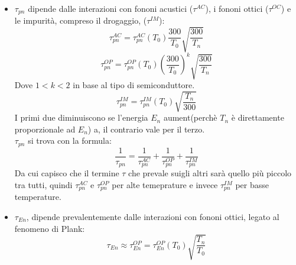 \begin{itemize}
    \item  $\tau_{pn}$ dipende dalle interazioni con fononi acustici ($\tau^{AC}$), i fononi ottici ($\tau^{OC}$) e le impurità, compreso il drogaggio, ($\tau^{IM}$):
\begin{equation}
    \tau_{pn}^{AC}=\tau_{pn}^{AC}(T_0)\dfrac{300}{T_0}\sqrt{\dfrac{300}{T_n}}
\end{equation}
\begin{equation}
    \tau_{pn}^{OP}=\tau_{pn}^{OP}(T_0)\left(\dfrac{300}{T_0}\right)^k\sqrt{\dfrac{300}{T_n}}
\end{equation}
Dove $1<k<2$ in base al tipo di semiconduttore.
\begin{equation}
    \tau_{pn}^{IM}=\tau_{pn}^{IM}(T_0)\sqrt{\dfrac{T_n}{300}}
\end{equation}
I primi due diminuiscono se l'energia $E_n$ aument(perchè $T_n$ è direttamente proporzionale ad $E_n$) a, il contrario vale per il terzo.\\
$\tau_{pn}$ si trova con la formula:
\begin{equation}
    \dfrac{1}{\tau_{pn}}=\dfrac{1}{\tau_{pn}^{AC}}+\dfrac{1}{\tau_{pn}^{OP}}+\dfrac{1}{\tau_{pn}^{IM}}
\end{equation}
Da cui capisco che il termine $\tau$ che prevale suigli altri sarà quello più piccolo tra tutti, quindi $\tau_{pn}^{AC}$ e $\tau_{pn}^{OP}$ per alte temeprature e invece $\tau_{pn}^{IM}$ per basse temperature.\\

 \item $\tau_{En}$, dipende prevalentemente dalle interazioni con fononi ottici, legato al fenomeno di Plank:
 \begin{equation}
     \tau_{En} \approx \tau_{En}^{OP}=\tau_{En}^{OP}(T_0)\sqrt{\dfrac{T_n}{T_0}}
 \end{equation}
 \end{itemize}
